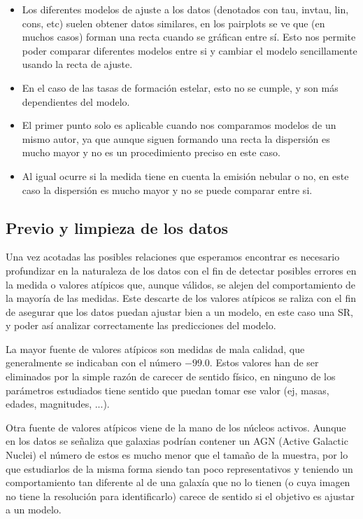 \documentclass[11pt, a4paper]{article} %
\begin{document}
\begin{itemize}
    \item Los diferentes modelos de ajuste a los datos (denotados con tau, invtau, lin, cons, etc) 
    suelen obtener datos similares, en los pairplots se ve que (en muchos casos) forman una recta cuando se gráfican entre sí. Esto nos permite poder comparar diferentes modelos entre si y cambiar el modelo sencillamente usando la recta de ajuste.
    \item En el caso de las tasas de formación estelar, esto no se cumple, y son más dependientes del modelo.
    \item El primer punto solo es aplicable cuando nos comparamos modelos de un mismo autor, ya que aunque siguen formando una recta la dispersión es mucho mayor y no es un procedimiento preciso en este caso.
    \item Al igual ocurre si la medida tiene en cuenta la emisión nebular o no, en este caso la dispersión es mucho mayor y no se puede comparar entre si.
    
\end{itemize}



\subsection{Previo y limpieza de los datos}

Una vez acotadas las posibles relaciones que esperamos encontrar es necesario profundizar en la naturaleza de los datos con 
el fin de detectar posibles errores en la medida o valores atípicos que, aunque válidos, se alejen del comportamiento de la mayoría de las medidas. 
Este descarte de los valores atípicos se raliza con el fin de asegurar que los datos puedan ajustar bien a un modelo, en este caso una SR, y poder así analizar 
correctamente las predicciones del modelo. 

La mayor fuente de valores atípicos son medidas de mala calidad, que generalmente se indicaban con el número $-99.0$. Estos valores han de ser eliminados por la simple razón de carecer de sentido físico, en ninguno de los parámetros estudiados tiene sentido que puedan tomar ese valor (ej, masas, edades, magnitudes, ...). 

Otra fuente de valores atípicos viene de la mano de los núcleos activos. Aunque en los datos se señaliza que galaxias podrían contener un AGN (Active Galactic Nuclei) el número de estos es mucho menor que el tamaño de la muestra, por lo que estudiarlos
de la misma forma siendo tan poco representativos y teniendo un comportamiento tan diferente al de una galaxía que no lo tienen (o cuya imagen no tiene la resolución para identificarlo) carece de sentido si el objetivo es ajustar a un modelo. 
\end{document}
